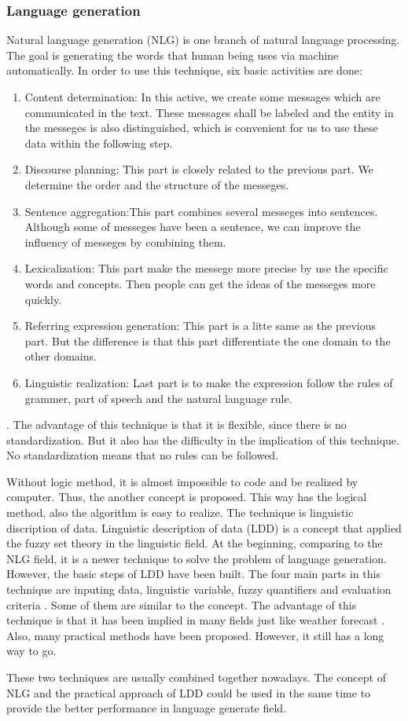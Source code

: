 \subsubsection*{Language generation}

Natural language generation (NLG) is one branch of natural language processing. The goal is generating the words that human being uses via machine automatically. In order to use this technique, six basic activities are done: 

\begin{enumerate}
	\item Content determination: In this active, we create some messages which are communicated in the text. 
	These messages shall be labeled and the entity in the messeges is also distinguished, which is convenient for us to 
	use these data within the following step.
	\item Discourse planning: This part is closely related to the previous part. 
	We determine the order and the structure of the messeges.
	\item Sentence aggregation:This part combines several messeges into sentences. 
	Although some of messeges have been a sentence, we can improve the influency of messeges by combining them.
	\item Lexicalization: This part make the messege more precise by use the specific words and concepts. 
	Then people can get the ideas of the messeges more quickly.
	\item Referring expression generation: This part is a litte same as the previous part. 
	But the difference is that this part differentiate the one domain to the other domains.
	\item Linguistic realization: Last part is to make the expression follow the rules of grammer, part of speech and the natural language rule.
	
\end{enumerate}
\cite{aramossoto2016onthe}. The advantage of this technique is that it is flexible, since there is no standardization. But it also has the difficulty in the implication of this technique. \cite{aramossoto2016onthe} No standardization means that no rules can be followed. 

Without logic method, it is almost impossible to code and be realized by computer. Thus, the another concept is proposed. This way has the logical method, also the algorithm is easy to realize. The technique is linguistic discription of data.
Linguistic description of data (LDD) is a concept that applied the fuzzy set theory in the linguistic field. At the beginning, comparing to the NLG field, it is a newer technique to solve the problem of language generation. However, the basic steps of LDD have been built. 
The four main parts in this technique are inputing data, linguistic variable, fuzzy quantifiers and evaluation criteria \cite{aramossoto2016onthe}. 
Some of them are similar to the concept. The advantage of this technique is that it has been implied in many fields just like weather forecast \cite{Ramos-SotoBBT14}. Also, many practical methods have been proposed. However, it still has a long way to go.

These two techniques are usually combined together nowadays. The concept of NLG and the practical approach of LDD could be used in the same time to provide the better performance in language generate field.
\newpage %